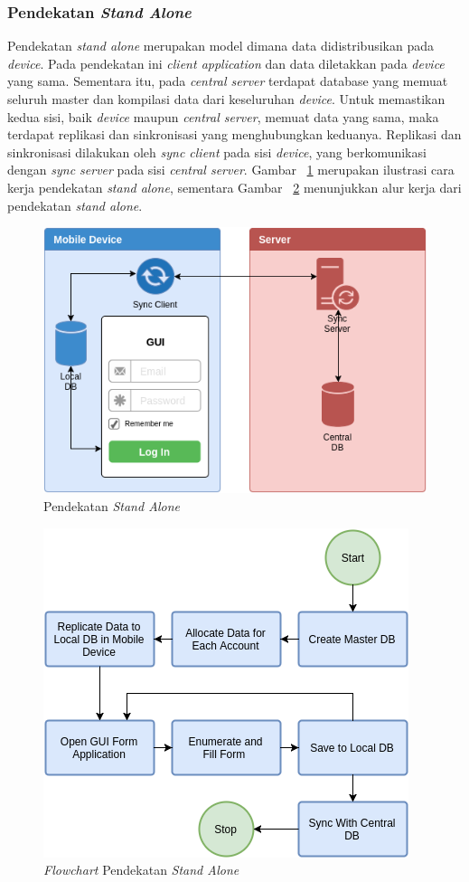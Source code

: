 \subsubsection{Pendekatan \textit{Stand Alone}} \label{sssec:stand-alone}

Pendekatan \textit{stand alone} merupakan model dimana data didistribusikan pada \textit{device}. Pada pendekatan ini \textit{client application} dan data diletakkan pada \textit{device} yang sama. Sementara itu, pada \textit{central server} terdapat database yang memuat seluruh master dan kompilasi data dari keseluruhan \textit{device}. Untuk memastikan kedua sisi, baik \textit{device} maupun \textit{central server}, memuat data yang sama, maka terdapat replikasi dan sinkronisasi yang menghubungkan keduanya. Replikasi dan sinkronisasi dilakukan oleh \textit{sync client} pada sisi \textit{device}, yang berkomunikasi dengan \textit{sync server} pada sisi \textit{central server}. Gambar ~\ref{fig:design-stand-alone} merupakan ilustrasi cara kerja pendekatan \textit{stand alone}, sementara Gambar ~\ref{fig:design-stand-alone-flowchart} menunjukkan alur kerja dari pendekatan \textit{stand alone}.

\begin{figure}[h]
    \centering
    \includegraphics[width=.7\textwidth]{../../Resources/Images/design-stand-alone}
    \caption{Pendekatan \textit{Stand Alone}}
    \label{fig:design-stand-alone}
\end{figure}

\begin{figure}[h]
    \centering
    \includegraphics[width=.7\textwidth]{../../Resources/Images/design-stand-alone-flowchart}
    \caption{\textit{Flowchart} Pendekatan \textit{Stand Alone}}
    \label{fig:design-stand-alone-flowchart}
\end{figure}

